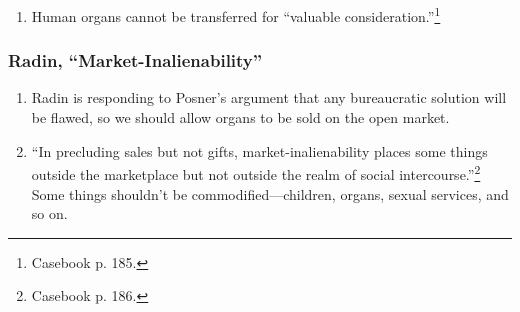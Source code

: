 \begin{enumerate}
    \item Human organs cannot be transferred for ``valuable 
    consideration.''\footnote{Casebook p. 185.}
\end{enumerate}

\subsubsection{Radin, ``Market-Inalienability''}

\begin{enumerate}
    \item Radin is responding to Posner's argument that any bureaucratic 
    solution will be flawed, so we should allow organs to be sold on the open 
    market.
    \item ``In precluding sales but not gifts, market-inalienability places 
    some things outside the marketplace but not outside the realm of social 
    intercourse.''\footnote{Casebook p. 186.} Some things shouldn't be 
    commodified---children, organs, sexual services, and so on.
\end{enumerate}

